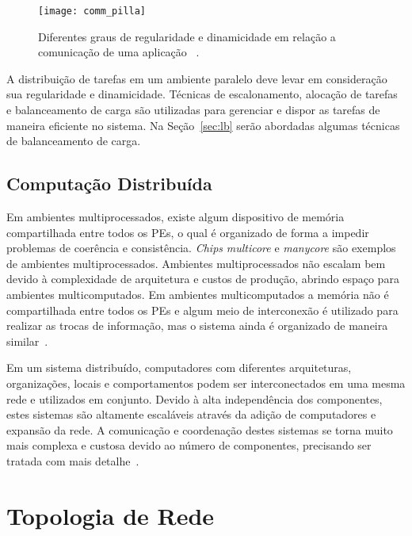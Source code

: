 \begin{figure} [h]
\texttt{[image: comm\_pilla]}
\centering
\caption[Diferentes graus de regularidade e dinamicidade em relação a comunicação de uma aplicação.]{Diferentes graus de regularidade e dinamicidade em relação a comunicação de uma aplicação ~\cite{pilla-thesis}.}
\label{fig:communication}
\end{figure}

A distribuição de tarefas em um ambiente paralelo deve levar em consideração sua regularidade e dinamicidade. 
Técnicas de escalonamento, alocação de tarefas e balanceamento de carga são utilizadas para gerenciar e dispor as tarefas de maneira eficiente no sistema. 
Na Seção~\ref{sec:lb} serão abordadas algumas técnicas de balanceamento de carga.

\subsection{Computação Distribuída}

Em ambientes multiprocessados, existe algum dispositivo de memória compartilhada entre todos os PEs, o qual é organizado de forma a impedir problemas de coerência e consistência. \textit{Chips} \textit{multicore} e \textit{manycore} são exemplos de ambientes multiprocessados. 
Ambientes multiprocessados não escalam bem devido à complexidade de arquitetura e custos de produção, abrindo espaço para ambientes multicomputados. 
Em ambientes multicomputados a memória não é compartilhada entre todos os PEs e algum meio de interconexão é utilizado para realizar as trocas de informação, mas o sistema ainda é organizado de maneira similar~\cite{tanenbaum:operational_systems}.

Em um sistema distribuído, computadores com diferentes arquiteturas, organizações, locais e comportamentos podem ser interconectados em uma mesma rede e utilizados em conjunto. 
Devido à alta independência dos componentes, estes sistemas são altamente escaláveis através da adição de computadores e expansão da rede. 
A comunicação e coordenação destes sistemas se torna muito mais complexa e custosa devido ao número de componentes, precisando ser tratada com mais detalhe~\cite{tanenbaum:operational_systems}.


\section{Topologia de Rede}
\label{sec:topologia}

